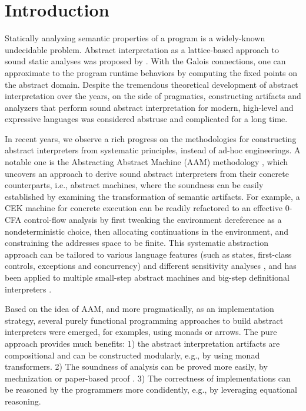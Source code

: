 \section{Introduction} \label{intro}

Statically analyzing semantic properties of a program is a
widely-known undecidable problem. Abstract interpretation as a
lattice-based approach to sound static analyses was proposed
by \citet{DBLP:conf/popl/CousotC77}. With the Galois connections, one
can approximate to the program runtime behaviors by computing the
fixed points on the abstract domain. Despite the tremendous
theoretical development of abstract interpretation over the years, on
the side of pragmatics, constructing artifacts and analyzers that
perform sound abstract interpretation for modern, high-level and
expressive languages was considered abstruse and complicated for a
long time.

In recent years, we observe a rich progress on the methodologies for
constructing abstract interpreters from systematic principles, instead
of ad-hoc engineerings. A notable one is the Abstracting Abstract
Machine (AAM) methodology \cite{DBLP:journals/jfp/HornM12,
  DBLP:conf/icfp/HornM10}, which uncovers an approach to derive sound
abstract interpreters from their concrete counterparts, i.e., abstract
machines, where the soundness can be easily established by examining
the transformation of semantic artifacts. For example, a CEK machine
\cite{DBLP:conf/popl/FelleisenF87} for concrete execution can be
readily refactored to an effective $0$-CFA control-flow analysis
\cite{Shivers:1988:CFA:53990.54007,
  Midtgaard:2012:CAF:2187671.2187672} by first tweaking the
environment dereference as a nondeterministic choice, then allocating
continuations in the environment, and constraining the addresses space
to be finite. This systematic abstraction approach can be tailored to
various language features (such as states, first-class controls,
exceptions and concurrency) and different sensitivity analyses
\cite{DBLP:conf/icfp/Gilray0M16, DBLP:conf/popl/GilrayL0MH16,
  Darais:2015:GTM:2814270.2814308}, and has been applied to multiple
small-step abstract machines \cite{DBLP:journals/jfp/HornM12,
  DBLP:conf/icfp/HornM10, Sergey:2013:MAI:2491956.2491979} and
big-step definitional interpreters \cite{Wei:2018:RAA:3243631.3236800,
  DBLP:journals/pacmpl/DaraisLNH17, Keidel:2018:CSP:3243631.3236767}.

Based on the idea of AAM, and more pragmatically, as an implementation
strategy, several purely functional programming approaches to build
abstract interpreters were emerged, for examples, using monads or
arrows. The pure approach provides much benefits: 1) the abstract
interpretation artifacts are compositional and can be constructed
modularly, e.g., by using monad transformers. 2) The soundness of
analysis can be proved more easily, by mechnization
\cite{Darais:2016:CGC:2951913.2951934} or paper-based proof
\cite{Keidel:2018:CSP:3243631.3236767}.  3) The correctness of
implementations can be reasoned by the programmers more condidently,
e.g., by leveraging equational reasoning.

